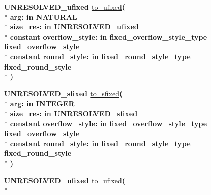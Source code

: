 \begin{DoxyCompactItemize}
\item 
{\bfseries {\bfseries \textcolor{vhdlchar}{U\+N\+R\+E\+S\+O\+L\+V\+E\+D\+\_\+ufixed}\textcolor{vhdlchar}{ }}} \hyperlink{class__fixed__pkg_ade2913ec678d66be09db3a25d30ded44}{to\+\_\+ufixed}{\bfseries  ( }\\*
{\bfseries \textcolor{vhdlchar}{arg\+: }\textcolor{stringliteral}{in }{\bfseries \textcolor{comment}{N\+A\+T\+U\+R\+A\+L}\textcolor{vhdlchar}{ }}}\\*
{\bfseries \textcolor{vhdlchar}{size\+\_\+res\+: }\textcolor{stringliteral}{in }\textcolor{vhdlchar}{U\+N\+R\+E\+S\+O\+L\+V\+E\+D\+\_\+ufixed}}\\*
{\bfseries {\bfseries \textcolor{keywordflow}{constant}\textcolor{vhdlchar}{ }}\textcolor{vhdlchar}{overflow\+\_\+style\+: }\textcolor{stringliteral}{in }\textcolor{vhdlchar}{fixed\+\_\+overflow\+\_\+style\+\_\+type     fixed\+\_\+overflow\+\_\+style}}\\*
{\bfseries {\bfseries \textcolor{keywordflow}{constant}\textcolor{vhdlchar}{ }}\textcolor{vhdlchar}{round\+\_\+style\+: }\textcolor{stringliteral}{in }\textcolor{vhdlchar}{fixed\+\_\+round\+\_\+style\+\_\+type     fixed\+\_\+round\+\_\+style}}\\*
{\bfseries  )} 
\item 
{\bfseries {\bfseries \textcolor{vhdlchar}{U\+N\+R\+E\+S\+O\+L\+V\+E\+D\+\_\+sfixed}\textcolor{vhdlchar}{ }}} \hyperlink{class__fixed__pkg_a575822ec305f0e37fa911df9b379bf4c}{to\+\_\+sfixed}{\bfseries  ( }\\*
{\bfseries \textcolor{vhdlchar}{arg\+: }\textcolor{stringliteral}{in }{\bfseries \textcolor{comment}{I\+N\+T\+E\+G\+E\+R}\textcolor{vhdlchar}{ }}}\\*
{\bfseries \textcolor{vhdlchar}{size\+\_\+res\+: }\textcolor{stringliteral}{in }\textcolor{vhdlchar}{U\+N\+R\+E\+S\+O\+L\+V\+E\+D\+\_\+sfixed}}\\*
{\bfseries {\bfseries \textcolor{keywordflow}{constant}\textcolor{vhdlchar}{ }}\textcolor{vhdlchar}{overflow\+\_\+style\+: }\textcolor{stringliteral}{in }\textcolor{vhdlchar}{fixed\+\_\+overflow\+\_\+style\+\_\+type     fixed\+\_\+overflow\+\_\+style}}\\*
{\bfseries {\bfseries \textcolor{keywordflow}{constant}\textcolor{vhdlchar}{ }}\textcolor{vhdlchar}{round\+\_\+style\+: }\textcolor{stringliteral}{in }\textcolor{vhdlchar}{fixed\+\_\+round\+\_\+style\+\_\+type     fixed\+\_\+round\+\_\+style}}\\*
{\bfseries  )} 
\item 
{\bfseries {\bfseries \textcolor{vhdlchar}{U\+N\+R\+E\+S\+O\+L\+V\+E\+D\+\_\+ufixed}\textcolor{vhdlchar}{ }}} \hyperlink{class__fixed__pkg_a450c24c2f73938e897e818ad413d78bf}{to\+\_\+ufixed}{\bfseries  ( }\\*

\end{DoxyCompactItemize}
